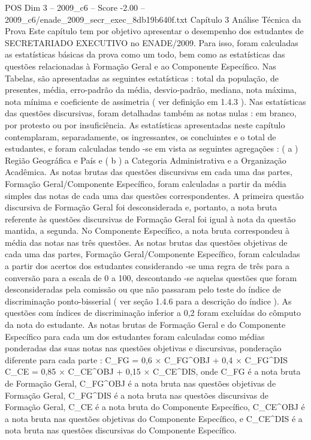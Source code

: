 \begin{textsample}{POS Dim 3 – 2009\_c6 – Score -2.00 – 2009\_c6/enade\_2009\_secr\_exec\_8db19b640f.txt}  \label{ex:f3_pos_240}
Capítulo 3 Análise Técnica da Prova Este capítulo tem por objetivo apresentar o desempenho dos estudantes de SECRETARIADO EXECUTIVO no ENADE/2009.
Para isso, foram calculadas as estatísticas básicas da prova como um todo, bem como as estatísticas das questões relacionadas à Formação Geral e ao Componente Específico.
Nas Tabelas, são apresentadas as seguintes estatísticas : total da população, de presentes, média, erro-padrão da média, desvio-padrão, mediana, nota máxima, nota mínima e coeficiente de assimetria ( ver definição em 1.4.3 ).
Nas estatísticas das questões discursivas, foram detalhadas também as notas nulas : em branco, por protesto ou por insuficiência.
As estatísticas apresentadas neste capítulo contemplaram, separadamente, os ingressantes, os concluintes e o total de estudantes, e foram calculadas tendo -se em vista as seguintes agregações : ( a ) Região Geográfica e País e ( b ) a Categoria Administrativa e a Organização Acadêmica.
As notas brutas das questões discursivas em cada uma das partes, Formação Geral/Componente Específico, foram calculadas a partir da média simples das notas de cada uma das questões correspondentes.
A primeira questão discursiva de Formação Geral foi desconsiderada e, portanto, a nota bruta referente às questões discursivas de Formação Geral foi igual à nota da questão mantida, a segunda.
No Componente Específico, a nota bruta correspondeu à média das notas nas três questões.
As notas brutas das questões objetivas de cada uma das partes, Formação Geral/Componente Específico, foram calculadas a partir dos acertos dos estudantes considerando -se uma regra de três para a conversão para a escala de 0 a 100, descontando -se aquelas questões que foram desconsideradas pela comissão ou que não passaram pelo teste do índice de discriminação ponto-bisserial ( ver seção 1.4.6 para a descrição do índice ).
As questões com índices de discriminação inferior a 0,2 foram excluídas do cômputo da nota do estudante.
As notas brutas de Formação Geral e do Componente Específico para cada um dos estudantes foram calculadas como médias ponderadas das suas notas nas questões objetivas e discursivas, ponderação diferente para cada parte : C\_FG = 0,6 × C\_FG\textasciicircum{}OBJ + 0,4 × C\_FG\textasciicircum{}DIS C\_CE = 0,85 × C\_CE\textasciicircum{}OBJ + 0,15 × C\_CE\textasciicircum{}DIS, onde C\_FG é a nota bruta de Formação Geral, C\_FG\textasciicircum{}OBJ é a nota bruta nas questões objetivas de Formação Geral, C\_FG\textasciicircum{}DIS é a nota bruta nas questões discursivas de Formação Geral, C\_CE é a nota bruta do Componente Específico, C\_CE\textasciicircum{}OBJ é a nota bruta nas questões objetivas do Componente Específico, e C\_CE\textasciicircum{}DIS é a nota bruta nas questões discursivas do Componente Específico.

\end{textsample}
